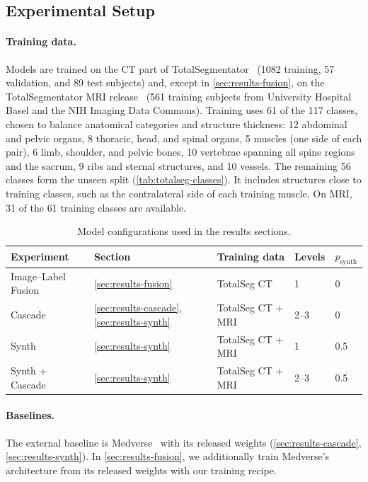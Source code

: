 \subsection{Experimental Setup}\label{sec:results-setup}

\paragraph{Training data.}
Models are trained on the CT part of
TotalSegmentator~\cite{wasserthalTotalSegmentatorRobustSegmentation2023}
(1082 training, 57 validation, and 89 test subjects) and, except in
\autoref{sec:results-fusion}, on the TotalSegmentator MRI release~\cite{dantonoliTotalSegmentatorMRIRobust2025}
(561 training subjects from University Hospital Basel and the NIH Imaging
Data Commons). Training uses 61 of the 117 classes, chosen to balance
anatomical categories and structure thickness: 12 abdominal and pelvic organs,
8 thoracic, head, and spinal organs, 5 muscles (one side of each pair), 6 limb,
shoulder, and pelvic bones, 10 vertebrae spanning all spine regions and the sacrum, 9 ribs
and sternal structures, and 10 vessels. The remaining 56 classes form the
unseen split (\autoref{tab:totalseg-classes}). It includes structures close to training classes, such as the
contralateral side of each training muscle. On MRI, 31 of the 61 training
classes are available.


\begin{table}[t]
  \centering
  \small
  \caption{Model configurations used in the results sections.}
  \label{tab:configs}
  \begin{tabular}{@{}lllll@{}}
    \toprule
    Experiment & Section & Training data & Levels & $p_\text{synth}$  \\
    \midrule
    Image--Label Fusion & \ref{sec:results-fusion} & TotalSeg CT & 1 & 0  \\
    Cascade & \ref{sec:results-cascade}, \ref{sec:results-synth} & TotalSeg CT + MRI & 2--3 & 0 \\
    Synth & \ref{sec:results-synth} & TotalSeg CT + MRI & 1 & 0.5 \\
    Synth + Cascade & \ref{sec:results-synth} & TotalSeg CT + MRI & 2--3 & 0.5 \\
    \bottomrule
  \end{tabular}
\end{table}


\paragraph{Baselines.}
The external baseline is Medverse~\cite{huMedverseUniversalModel2025a} with
its released weights (\autoref{sec:results-cascade},
\autoref{sec:results-synth}). In \autoref{sec:results-fusion}, we additionally
train Medverse's architecture from its released weights with our training
recipe.



